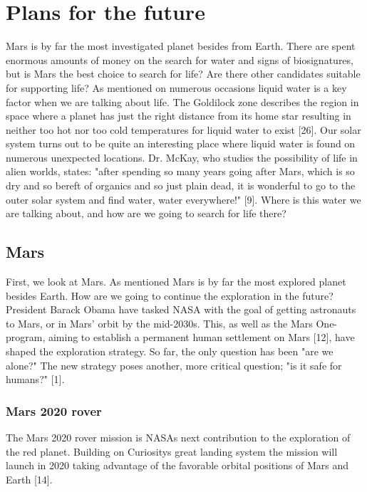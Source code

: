 \section*{Plans for the future}

Mars is by far the most investigated planet besides from Earth. 
There are spent enormous amounts of money on the search for water and signs of biosignatures, but is Mars the best choice to search for life? 
Are there other candidates suitable for supporting life? 
As mentioned on numerous occasions liquid water is a key factor when we are talking about life. 
The Goldilock zone describes the region in space where a planet has just the right distance from its home star resulting in neither too hot nor too cold temperatures for liquid water to exist [26]. 
Our solar system turns out to be quite an interesting place where liquid water is found on numerous unexpected locations. 
Dr. McKay, who studies the possibility of life in alien worlds, states: "after spending so many years going after Mars, which is so dry and so bereft of organics and so just plain dead, it is wonderful to go to the outer solar system and find water, water everywhere!" [9].
Where is this water we are talking about, and how are we going to search for life there?
 
\subsection*{Mars}

First, we look at Mars. 
As mentioned Mars is by far the most explored planet besides Earth. 
How are we going to continue the exploration in the future?
President Barack Obama have tasked NASA with the goal of getting astronauts to Mars, or in Mars' orbit by the mid-2030s. 
This, as well as the Mars One-program, aiming to establish a permanent human settlement on Mars [12], have shaped the exploration strategy. 
So far, the only question has been "are we alone?" 
The new strategy poses another, more critical question; "is it safe for humans?" [1].

\subsubsection*{Mars 2020 rover}

The Mars 2020 rover mission is NASAs next contribution to the exploration of the red planet. 
Building on Curiositys great landing system the mission will launch in 2020 taking advantage of the favorable orbital positions of Mars and Earth [14]. 

